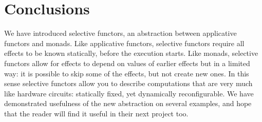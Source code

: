 \section{Conclusions}\label{sec-conclusions}

We have introduced selective functors, an abstraction between applicative
functors and monads. Like applicative functors, selective functors require all
effects to be known statically, before the execution starts. Like monads,
selective functors allow for effects to depend on values of earlier effects but
in a limited way: it is possible to skip some of the effects, but not create
new ones. In this sense selective functors allow you to describe computations
that are very much like hardware circuits: statically fixed, yet dynamically
reconfigurable. We have demonstrated usefulness of the new abstraction on
several examples, and hope that the reader will find it useful in their next
project too.
